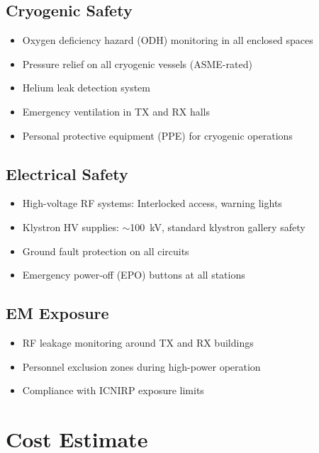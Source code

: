 \documentclass[11pt,letterpaper]{article}
\begin{document}
\subsection{Cryogenic Safety}

\begin{itemize}
\item Oxygen deficiency hazard (ODH) monitoring in all enclosed spaces
\item Pressure relief on all cryogenic vessels (ASME-rated)
\item Helium leak detection system
\item Emergency ventilation in TX and RX halls
\item Personal protective equipment (PPE) for cryogenic operations
\end{itemize}

\subsection{Electrical Safety}

\begin{itemize}
\item High-voltage RF systems: Interlocked access, warning lights
\item Klystron HV supplies: $\sim$100~kV, standard klystron gallery safety
\item Ground fault protection on all circuits
\item Emergency power-off (EPO) buttons at all stations
\end{itemize}

\subsection{EM Exposure}

\begin{itemize}
\item RF leakage monitoring around TX and RX buildings
\item Personnel exclusion zones during high-power operation
\item Compliance with ICNIRP exposure limits
\end{itemize}

\section{Cost Estimate}
\end{document}
